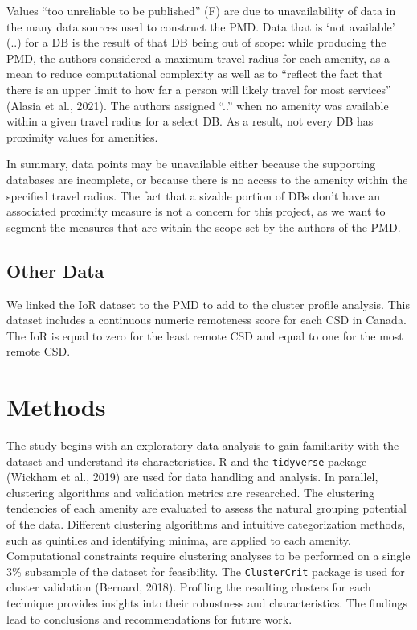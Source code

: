 \documentclass[11pt, a4paper]{article}
\begin{document}
Values ``too unreliable to be published'' (F) are due to unavailability of data in the many data sources used to construct the PMD. Data that is `not available' (..) for a DB is the result of that DB being out of scope: while producing the PMD, the authors considered a maximum travel radius for each amenity, as a mean to reduce computational complexity as well as to ``reflect the fact that there is an upper limit to how far a person will likely travel for most services'' (Alasia et al., 2021). The authors assigned ``..'' when no amenity was available within a given travel radius for a select DB. As a result, not every DB has proximity values for amenities.
\par
In summary, data points may be unavailable either because the supporting databases are incomplete, or because there is no access to the amenity within the specified travel radius. The fact that a sizable portion of DBs don't have an associated proximity measure is not a concern for this project, as we want to segment the measures that are within the scope set by the authors of the PMD.








\subsection{Other Data}


We linked the IoR dataset to the PMD to add to the cluster profile analysis. This dataset includes a continuous numeric remoteness score for each CSD in Canada. The IoR is equal  to zero for the least remote CSD and equal to one for the most remote CSD.









\pagebreak
\section{Methods}

The study begins with an exploratory data analysis to gain familiarity with the dataset and understand its characteristics. R and the \texttt{tidyverse} package (Wickham et al., 2019) are used for data handling and analysis. In parallel, clustering algorithms and validation metrics are researched. The clustering tendencies of each amenity are evaluated to assess the natural grouping potential of the data. Different clustering algorithms and intuitive categorization methods, such as quintiles and identifying minima, are applied to each amenity. Computational constraints require clustering analyses to be performed on a single 3\% subsample of the dataset for feasibility. The \texttt{ClusterCrit} package is used for cluster validation (Bernard, 2018). Profiling the resulting clusters for each technique provides insights into their robustness and characteristics. The findings lead to conclusions and recommendations for future work.
\end{document}
